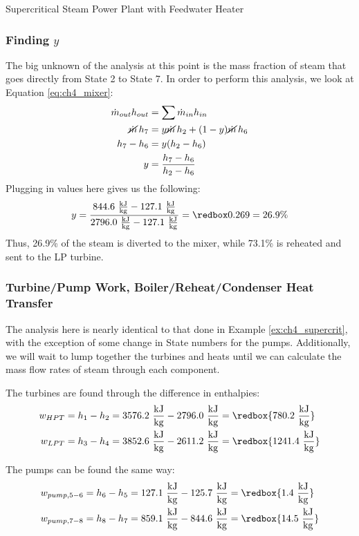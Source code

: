 \begin{example}[label=ex:ch4FeedwaterHeater]{Supercritical Steam Power Plant with Feedwater Heater}
  \subsubsection*{Finding $y$}
  The big unknown of the analysis at this point is the mass fraction of steam that goes directly from State 2 to State 7.  In order to perform this analysis, we look at Equation \ref{eq:ch4_mixer}:
  \begin{align*}
    \dot{m}_{out} h_{out} &= \sum \dot{m}_{in} h_{in} \\
    \cancel{\dot{m}}\, h_7 &= y \cancel{\dot{m}}\, h_2 + (1-y)\cancel{\dot{m}}\,h_6 \\
    h_7 - h_6 &= y(h_2 - h_6) \\
    y &= \frac{h_7 - h_6}{h_2-h_6}
  \end{align*}
  Plugging in values here gives us the following:
  \begin{equation*}
    y = \frac{844.6\ \frac{\rm kJ}{\rm kg} - 127.1\ \frac{\rm kJ}{\rm kg}}{2796.0\ \frac{\rm kJ}{\rm kg}-127.1\ \frac{\rm kJ}{\rm kg}} = \redbox{0.269 = 26.9\%}
  \end{equation*}
  Thus, 26.9\% of the steam is diverted to the mixer, while 73.1\% is reheated and sent to the LP turbine.

  \subsubsection*{Turbine/Pump Work, Boiler/Reheat/Condenser Heat Transfer}
  The analysis here is nearly identical to that done in Example \ref{ex:ch4_supercrit}, with the exception of some change in State numbers for the pumps.  Additionally, we will wait to lump together the turbines and heats until we can calculate the mass flow rates of steam through each component.

  The turbines are found through the difference in enthalpies:
  \begin{align*}
    w_{HPT} &= h_1 - h_2 = 3576.2\ \frac{\rm kJ}{\rm kg} - 2796.0\ \frac{\rm kJ}{\rm kg} = \redbox{780.2\ \frac{\rm kJ}{\rm kg}} \\
    w_{LPT} &= h_3 - h_4 = 3852.6\ \frac{\rm kJ}{\rm kg} - 2611.2\ \frac{\rm kJ}{\rm kg} = \redbox{1241.4\ \frac{\rm kJ}{\rm kg}}
  \end{align*}

  The pumps can be found the same way:
  \begin{align*}
    w_{pump, 5-6} &= h_6 - h_5 = 127.1\ \frac{\rm kJ}{\rm kg} - 125.7\ \frac{\rm kJ}{\rm kg} = \redbox{1.4\ \frac{\rm kJ}{\rm kg}} \\
    w_{pump, 7-8} &= h_8 - h_7 = 859.1\ \frac{\rm kJ}{\rm kg} - 844.6\ \frac{\rm kJ}{\rm kg} = \redbox{14.5\ \frac{\rm kJ}{\rm kg}}
  \end{align*}


\end{example}
